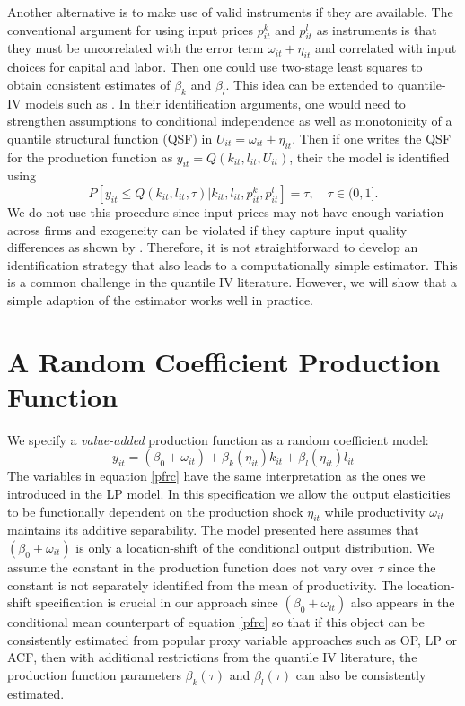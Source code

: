 \documentclass[11pt]{article}
\begin{document}
Another alternative is to make use of valid instruments if they are available. The conventional argument for using input prices $p^{k}_{it}$ and $p^{l}_{it}$ as instruments is that they must be uncorrelated with the error term $\omega_{it}+\eta_{it}$ and correlated with input choices for capital and labor. Then one could use two-stage least squares to obtain consistent estimates of $\beta_{k}$ and $\beta_{l}$. This idea can be extended to quantile-IV models such as \cite{Chernozhukov2005}. In their identification arguments, one would need to strengthen assumptions to conditional independence as well as monotonicity of a quantile structural function (QSF) in $U_{it}=\omega_{it}+\eta_{it}$. Then if one writes the QSF for the production function as $y_{it}=Q(k_{it}, l_{it}, U_{it})$, their the model is identified using
\begin{equation}
P[y_{it}\leq Q(k_{it}, l_{it}, \tau)|k_{it}, l_{it}, p^{k}_{it}, p^{l}_{it}]=\tau, \quad \tau\in (0,1].
\end{equation}
We do not use this procedure since input prices may not have enough variation across firms and exogeneity can be violated if they capture input quality differences as shown by \cite{Griliches1986}. Therefore, it is not straightforward to develop an identification strategy that also leads to a computationally simple estimator. This is a common challenge in the quantile IV literature. However, we will show that a simple adaption of the \cite{Canay2011} estimator works well in practice.


\section{A Random Coefficient Production Function} \label{ourmodel}
We specify a \textit{value-added} production function as a random coefficient model:
\begin{equation} \label{pfrc}
    y_{it}=(\beta_{0}+\omega_{it})+\beta_{k}(\eta_{it})k_{it}+\beta_{l}(\eta_{it})l_{it}
\end{equation}
The variables in equation \eqref{pfrc} have the same interpretation as the ones we introduced in the LP model. In this specification we allow the output elasticities to be functionally dependent on the production shock $\eta_{it}$ while productivity $\omega_{it}$ maintains its additive separability. The model presented here assumes that $(\beta_{0}+\omega_{it})$ is only a location-shift of the conditional output distribution. We assume the constant in the production function does not vary over $\tau$ since the constant is not separately identified from the mean of productivity. The location-shift specification is crucial in our approach since $(\beta_{0}+\omega_{it})$ also appears in the conditional mean counterpart of equation \eqref{pfrc} so that if this object can be consistently estimated from popular proxy variable approaches such as OP, LP or ACF, then with additional restrictions from the quantile IV literature, the production function parameters $\beta_{k}(\tau)$ and $\beta_{l}(\tau)$ can also be consistently estimated.
\end{document}
